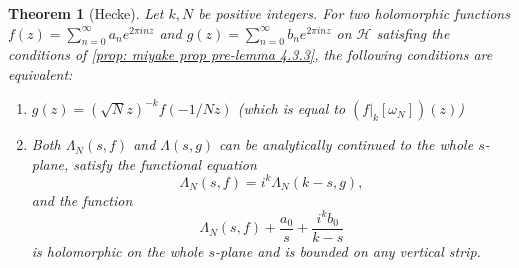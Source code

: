 \documentclass[10pt,leqno,twoside]{article}
\theoremstyle{plain}
\newtheorem{theorem}[lem]{Theorem}
\theoremstyle{definition}
\numberwithin{equation}{section}
\numberwithin{lem}{section}
\begin{document}
\begin{theorem}[Hecke]\label{thm: miyake thm 4.3.6}
    Let $k,N$ be positive integers. For two holomorphic functions $f(z) = \sum_{n=0}^\infty a_ne^{2\pi i nz}$ and $g(z) = \sum_{n=0}^\infty b_ne^{2\pi i nz}$ on $\mathcal H$ satisfing the conditions of \cref{prop: miyake prop pre-lemma 4.3.3}, the following conditions are equivalent: 
    \begin{enumerate}[label = \textup{(\alph*)}]
        \item $g(z) = (\sqrt{N}z)^{-k}f(-1/Nz)$ \textup{(which is equal to $(f|_k[\omega_N])(z)$)}
        \item Both $\varLambda_N(s,f)$ and $\varLambda(s,g)$ can be analytically continued to the whole $s$-plane, satisfy the functional equation \[\varLambda_N(s,f) = i^k\varLambda_N(k-s,g),\] and the function \[\varLambda_N(s,f) + \frac{a_0}{s} + \frac{i^kb_0}{k-s}\] is holomorphic on the whole $s$-plane and is bounded on any vertical strip.
    \end{enumerate}
\end{theorem}
\end{document}

